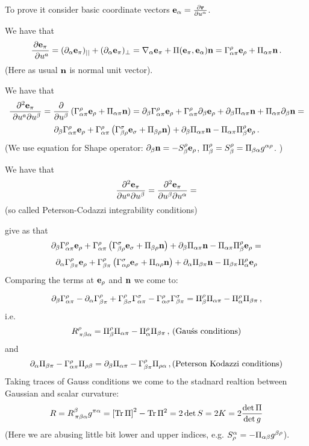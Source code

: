 To prove it consider basic coordinate vectors ${\bf e}_\alpha={\partial {\bf r}\over \partial u^\alpha}$.

We have  that
                    $$
     {\partial {\bf e}_\pi\over \ \partial u^a}=
(\partial_\alpha {\bf e}_\pi)_{||}+
(\partial_\alpha {\bf e}_\pi)_{\perp}=
\nabla_\alpha {\bf e}_\pi+\Pi ({\bf e}_\pi, {\bf e}_\alpha){\bf n}=
\Gamma_{\alpha\pi}^\rho{\bf e}_\rho+\Pi_{\alpha\pi}{\bf n}\,.
                     $$      
(Here as usual ${\bf n}$ is normal unit vector).

We have that
                     $$
     {\partial^2 {\bf e}_\pi\over \ \partial u^a\partial u^\beta}=
              {\partial\over \partial u^\beta}
         \left(
\Gamma_{\alpha\pi}^\rho{\bf e}_\rho+\Pi_{\alpha\pi}{\bf n}
        \right)=
    \partial_\beta\Gamma_{\alpha\pi}^\rho{\bf e}_\rho+
    \Gamma_{\alpha\pi}^\rho\partial_\beta{\bf e}_\rho+
      \partial_\beta\Pi_{\alpha\pi}{\bf n}+\Pi_{\alpha\pi}\partial_\beta {\bf n}=
                  $$
                  $$
    \partial_\beta\Gamma_{\alpha\pi}^\rho{\bf e}_\rho+
         \Gamma_{\alpha\pi}^\rho
                \left(
\Gamma_{\beta\rho}^\sigma{\bf e}_\sigma+\Pi_{\beta\rho}{\bf n}
                  \right)+
 \partial_\beta\Pi_{\alpha\pi}{\bf n}-\Pi_{\alpha\pi}\Pi_\beta^\rho{\bf e}_\rho\,.
                     $$
(We use equation  for  Shape operator:  $\partial_\beta{\bf n}=-S_\beta^\rho{\bf e}_\rho$,
$\Pi_\beta^\rho=S_\beta^\rho=\Pi_{\beta\alpha}g^{\alpha\rho}$. )


We have that 
               $$
     {\partial^2 {\bf e}_\pi\over  \partial u^a\partial u^\beta}=
     {\partial^2 {\bf e}_\pi\over  \partial u^\beta\partial u^\alpha}=
                      $$
(so called Peterson-Codazzi integrability conditions)

give as that
           $$
     \partial_\beta\Gamma_{\alpha\pi}^\rho{\bf e}_\rho+
         \Gamma_{\alpha\pi}^\rho
                \left(
\Gamma_{\beta\rho}^\sigma{\bf e}_\sigma+\Pi_{\beta\rho}{\bf n}
                  \right)+
 \partial_\beta\Pi_{\alpha\pi}{\bf n}-\Pi_{\alpha\pi}\Pi_\beta^\rho{\bf e}_\rho
             =
                         $$
                         $$
      \partial_\alpha\Gamma_{\beta\pi}^\rho{\bf e}_\rho+
         \Gamma_{\beta\pi}^\rho
                \left(
\Gamma_{\alpha\rho}^\sigma{\bf e}_\sigma+\Pi_{\alpha\rho}{\bf n}
                  \right)+
 \partial_\alpha\Pi_{\beta\pi}{\bf n}-\Pi_{\beta\pi}\Pi_\alpha^\rho{\bf e}_\rho
           $$
Comparing the terms at ${\bf e}_\rho$ and ${\bf n}$ we come to:

             $$
   \partial_\beta\Gamma_{\alpha     \pi}^\rho
   -\partial_\alpha   \Gamma_{\beta \pi}^\rho
      +\Gamma_{\beta \sigma}^\rho\Gamma_{\alpha\pi}^\sigma
      -\Gamma_{\alpha \sigma}^\rho\Gamma_{\beta\pi}^\sigma
             =
             \Pi_\beta^\rho\Pi_{\alpha\pi}-
             \Pi_\alpha^\rho\Pi_{\beta\pi}\,,
             $$
i.e.
                     $$
                 R^\rho_{\, \pi\beta\alpha}=
            \Pi_\beta^\rho\Pi_{\alpha\pi}-
             \Pi_\alpha^\rho\Pi_{\beta\pi}\,,\,
            (\hbox {Gau\'ss conditions})
                     $$
and
                 $$
\partial_\alpha\Pi_{\beta\pi}-\Gamma_{\alpha\pi}^\rho\Pi_{\rho\beta}=
\partial_\beta\Pi_{\alpha\pi}-\Gamma_{\beta\pi}^\rho\Pi_{\rho\alpha}\,,
  \hbox {(Peterson Kodazzi conditions)}
                 $$ 
Taking traces of Gauss conditions we come to
the stadnard realtion between Gaussian and scalar curvature: 
                      $$
    R=R^\beta_{\, \pi\beta\alpha}g^{\pi\alpha}=
 \left[{\rm Tr\,}\Pi\right]^2-
 {\rm Tr\,}\Pi^2=2\det S=2K=2{\det \Pi\over \det g}
                      $$
(Here we are abusing little bit lower and upper indices, e.g.
   $S^\alpha_\rho=-\Pi_{\alpha\beta}g^{\beta\rho}$).

